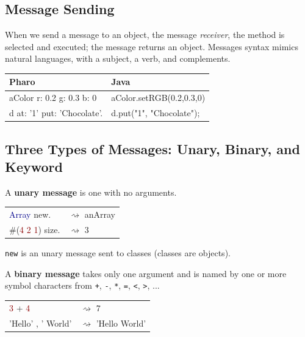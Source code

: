 \documentclass[notumble]{leaflet}
\newcommand{\code}[1]{\foreignlanguage{english}{\texttt{#1}}}
\begin{document}

\subsection{Message Sending}
When we send a message to an object, the message
\emph{receiver}, the method is selected and executed; the message returns an object. Messages syntax mimics
natural languages, with a subject, a verb, and complements. 


\noindent
\begin{tabularx}{\linewidth}{@{}lX@{}}
        \toprule
        \textbf{Pharo} & \textbf{Java}\\
\midrule
aColor r: 0.2 g: 0.3 b: 0&aColor.setRGB(0.2,0.3,0)\\
d at: '1' put: 'Chocolate'.&d.put("1", "Chocolate");\\
\midrule
\end{tabularx}


\subsection{Three Types of Messages: Unary, Binary, and Keyword}

A \textbf{unary message} is one with no arguments.

\noindent
\begin{tabularx}{\linewidth}{@{}lX@{}}
        \toprule
      \textcolor{darkBlue}{Array} new.& $\rightsquigarrow$ anArray \\
      \#(\textcolor{darkRed}{4 2 1}) size.& $\rightsquigarrow$ 3\\
       \midrule
\end{tabularx}

\code{new} is an unary message sent to classes (classes are objects). 

A \textbf{binary message} takes only one
argument and is named by one or more symbol characters from \code{+}, \code{-}, \code{*}, \code{=}, \code{<}, \code{>}, ...

\noindent
\begin{tabularx}{\linewidth}{@{}lX@{}}
        \toprule
      \textcolor{darkRed}{3} + \textcolor{darkRed}{4}& $\rightsquigarrow$ 7 \\
     \textcolor{string}{'Hello'} , \textcolor{string}{' World'}& $\rightsquigarrow$ 'Hello World'\\
       \midrule
\end{tabularx}
\end{document}
